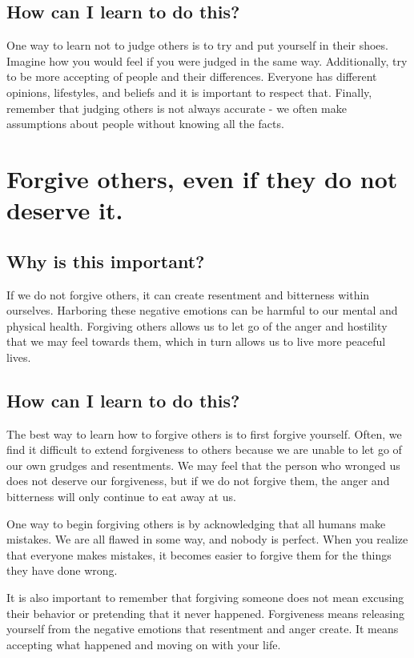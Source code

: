 \documentclass[11pt]{article}
\begin{document}
\subsection{How can I learn to do this?}
\label{sec:orgd454498}
One way to learn not to judge others is to try and put yourself in their shoes. Imagine how you would feel if you were judged in the same way. Additionally, try to be more accepting of people and their differences. Everyone has different opinions, lifestyles, and beliefs and it is important to respect that. Finally, remember that judging others is not always accurate - we often make assumptions about people without knowing all the facts.

\section{Forgive others, even if they do not deserve it.}
\label{sec:org5f4fef0}
\subsection{Why is this important?}
\label{sec:org17ef3ea}
If we do not forgive others, it can create resentment and bitterness within ourselves. Harboring these negative emotions can be harmful to our mental and physical health. Forgiving others allows us to let go of the anger and hostility that we may feel towards them, which in turn allows us to live more peaceful lives.

\subsection{How can I learn to do this?}
\label{sec:org97bccd0}
The best way to learn how to forgive others is to first forgive yourself. Often, we find it difficult to extend forgiveness to others because we are unable to let go of our own grudges and resentments. We may feel that the person who wronged us does not deserve our forgiveness, but if we do not forgive them, the anger and bitterness will only continue to eat away at us.

One way to begin forgiving others is by acknowledging that all humans make mistakes. We are all flawed in some way, and nobody is perfect. When you realize that everyone makes mistakes, it becomes easier to forgive them for the things they have done wrong.

It is also important to remember that forgiving someone does not mean excusing their behavior or pretending that it never happened. Forgiveness means releasing yourself from the negative emotions that resentment and anger create. It means accepting what happened and moving on with your life.
\end{document}
